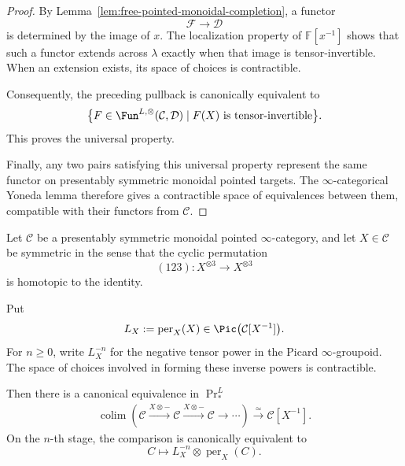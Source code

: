 \begin{proof}
By Lemma~\ref{lem:free-pointed-monoidal-completion}, a functor
\[
    \mathcal F\longrightarrow\mathcal D
\]
is determined by the image of \(x\).  The localization property of
\(\mathbb F[x^{-1}]\) shows that such a functor extends across
\(\lambda\) exactly when that image is tensor-invertible.  When an
extension exists, its space of choices is contractible.

Consequently, the preceding pullback is canonically equivalent to
\[
    \bigl\{
      F\in
      \Fun^{L,\otimes}(\mathcal C,\mathcal D)
      \mid
      F(X)\text{ is tensor-invertible}
    \bigr\}.
\]
This proves the universal property.

Finally, any two pairs satisfying this universal property represent the
same functor on presentably symmetric monoidal pointed targets.  The
\(\infty\)-categorical Yoneda lemma therefore gives a contractible space of
equivalences between them, compatible with their functors from
\(\mathcal C\).
\end{proof}

\begin{lemma}
\label{lem:symmetric-object-telescope-comparison}
Let \(\mathcal C\) be a presentably symmetric monoidal pointed
\(\infty\)-category, and let \(X\in\mathcal C\) be symmetric in the sense
that the cyclic permutation
\[
    (123):
    X^{\otimes3}
    \longrightarrow
    X^{\otimes3}
\]
is homotopic to the identity.

Put
\[
    L_X
    :=
    \operatorname{per}_X(X)
    \in
    \Pic\bigl(\mathcal C[X^{-1}]\bigr).
\]
For \(n\geq0\), write \(L_X^{-n}\) for the negative tensor power in the
Picard \(\infty\)-groupoid.  The space of choices involved in forming these
inverse powers is contractible.

Then there is a canonical equivalence in \(\Pr^L_*\)
\[
\begin{aligned}
    \operatorname*{colim}
    \left(
      \mathcal C
      \xrightarrow{X\otimes-}
      \mathcal C
      \xrightarrow{X\otimes-}
      \mathcal C
      \longrightarrow\cdots
    \right)
    \xrightarrow{\simeq}
    \mathcal C[X^{-1}].
\end{aligned}
\]
On the \(n\)-th stage, the comparison is canonically equivalent to
\[
    C
    \longmapsto
    L_X^{-n}
    \otimes
    \operatorname{per}_X(C).
\]
\end{lemma}

